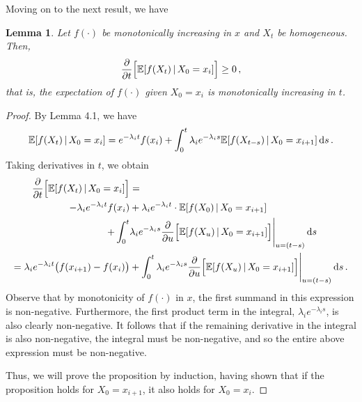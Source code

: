 \documentclass[10pt]{article}
\newtheorem{lemma}[theorem]{Lemma}
\newcommand{\dx}[1][x]{\text{\,d}#1}
\begin{document}
Moving on to the next result, we have
\begin{lemma}
Let $f(\cdot)$ be monotonically increasing in $x$ and $X_t$ be homogeneous. Then,
\begin{equation*}
\frac{\partial}{\partial t}\Bigl[\mathbb{E}[f(X_t)\,\vert\,X_0=x_i]\Bigr] \geq 0\,,
\end{equation*}
that is, the expectation of $f(\cdot)$ given $X_0=x_i$ is monotonically increasing in $t$.
\end{lemma}
\begin{proof}
By Lemma 4.1, we have
\begin{equation*}
\mathbb{E}[f(X_t)\,\vert\,X_0=x_i] = e^{-\lambda_i t}f(x_i) + \int_0^t \lambda_i e^{-\lambda_i s} \mathbb{E}[f(X_{t-s})\,\vert\,X_0=x_{i+1}]\dx[s]\,.
\end{equation*}
Taking derivatives in $t$, we obtain
\begin{align*}
\frac{\partial}{\partial t}\Bigl[\mathbb{E}[f(X_t)\,\vert\,X_0=x_i]\Bigr] &= \\
-\lambda_i e^{-\lambda_i t}f(x_i) &+ \lambda_i e^{-\lambda_i t}\cdot \mathbb{E}[f(X_0)\,\vert\,X_0=x_{i+1}] \\
 + \int_0^t &\lambda_i e^{-\lambda_i s} \frac{\partial}{\partial u}\Bigl[\mathbb{E}[f(X_{u})\,\vert\,X_0=x_{i+1}]\Bigr]\Bigg\vert_{u=(t-s)} \dx[s] \\
 = \lambda_i e^{-\lambda_i t}\bigl(f(x_{i+1}) - f(x_i)\bigr) &+ \int_0^t \lambda_i e^{-\lambda_i s} \frac{\partial}{\partial u}\Bigl[\mathbb{E}[f(X_{u})\,\vert\,X_0=x_{i+1}]\Bigr]\Bigg\vert_{u=(t-s)} \dx[s]\,.
\end{align*}
Observe that by monotonicity of $f(\cdot)$ in $x$, the first summand in this expression is non-negative. Furthermore, the first product term in the integral, $\lambda_i e^{-\lambda_i s}$, is also clearly non-negative. It follows that if the remaining derivative in the integral is also non-negative, the integral must be non-negative, and so the entire above expression must be non-negative.

Thus, we will prove the proposition by induction, having shown that if the proposition holds for $X_0=x_{i+1}$, it also holds for $X_0=x_i$.


\end{proof}
\end{document}

